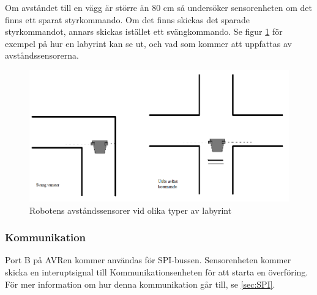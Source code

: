 Om avståndet till en vägg är större än 80 cm så undersöker sensorenheten om det finns ett sparat styrkommando. Om det finns skickas det sparade styrkommandot, annars skickas istället ett svängkommando. Se  figur \ref{fig:labkors} för exempel på hur en labyrint kan se ut, och vad som kommer att uppfattas av avståndssensorerna. 

\begin{figure}[H]
\includegraphics[angle=0,scale=0.5]{bilder/labkors.png}
  \caption{Robotens avståndssensorer vid olika typer av labyrint}
  \label{fig:labkors}
\end{figure}

\subsubsection{Kommunikation}
Port B på AVRen kommer användas för SPI-bussen. Sensorenheten kommer skicka en interuptsignal till Kommunikationsenheten för att starta en överföring. För mer information om hur denna kommunikation går till, se \ref{sec:SPI}.

